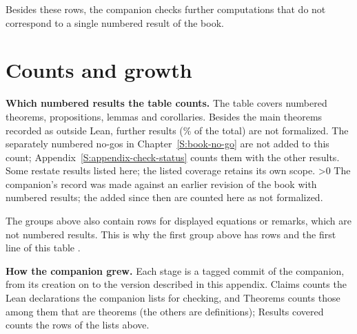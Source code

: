 \medskip
Besides these rows, the companion checks \lcUnlabelled{} further computations
that do not correspond to a single numbered result of the book.

\section{Counts and growth}\label{S:lean-counts}

\ifdefined\lcHaveCompletion
{}
\medskip
\noindent\textbf{Which numbered results the table counts.} The table covers
\lcNumberedTotal{} numbered theorems, propositions, lemmas and corollaries.
Besides the \lcOutsideNumbered{} main theorems recorded as outside Lean,
\lcNotFormalized{} further results (\lcNotFormalizedShare\% of the total) are
not formalized.
The separately numbered no-gos in Chapter~\ref{S:book-no-go} are not added to
this count; Appendix~\ref{S:appendix-check-status} counts them with the other
results. Some restate results listed here; the listed coverage retains
its own scope.
\ifnum\lcAddedSinceRecord>0 The companion's record was made against an earlier
revision of the book with \lcRecordTotal{} numbered results; the
\lcAddedSinceRecord{} added since then are counted here as not formalized.\fi
\begin{center}
\small\lcCompletionTable
\end{center}
The groups above also contain \lcOtherRows{} rows for displayed equations or
remarks, which are not numbered results. This is why the first group above has
\lcSameFullAll{} rows and the first line of this table \lcSameFullNumbered.

\medskip
\noindent\textbf{How the companion grew.} Each stage is a tagged commit of the
companion, from its creation on \lcFirstStageDate{} to the version described in
this appendix. Claims counts the Lean declarations the companion lists for
checking, and Theorems counts those among them that are theorems (the others
are definitions); Results covered counts the rows of the lists above.
\begin{center}
\small\lcMilestoneTable
\end{center}
\fi
